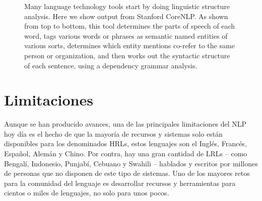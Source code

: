 \begin{figure}[bth]
  \caption[Ejemplo de parseo de dependencias]{Many language technology tools start by doing linguistic structure analysis. Here we show output from Stanford CoreNLP. As shown from top to
bottom, this tool determines the parts of speech of each word, tags various words or phrases as semantic named entities of various sorts, determines which entity
mentions co-refer to the same person or organization, and then works out the syntactic structure of each sentence, using a dependency grammar analysis.}
  \label{fig:corenlp}
\end{figure}

\section{Limitaciones}
\label{sec:nlplimits}

Aunque se han producido avances, una de las principales limitaciones del
\ac{NLP} hoy día es el hecho de que la mayoría de recursos y sistemas solo están
disponibles para los denominados \acp{HRL}, estos lenguajes son el Inglés, Francés, Español, Alemán y Chino. Por
contra, hay una gran cantidad de \acp{LRL} -- como Bengalí, Indonesio, Punjabí, Cebuano y Swahili -- hablados y
escritos por millones de personas que no disponen de este tipo de sistemas. Uno
de los mayores retos para la comunidad del lenguaje es desarrollar recursos y
herramientas para cientos o miles de lenguajes, no solo para unos pocos.


